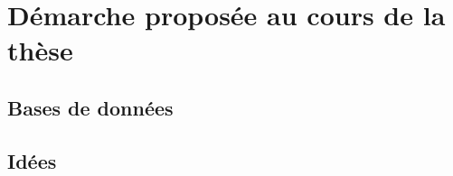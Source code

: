 \clearpage
\section{Démarche proposée au cours de la thèse}
\label{sec:SOTA}

\subsection{Bases de données}

\subsection{Idées}
